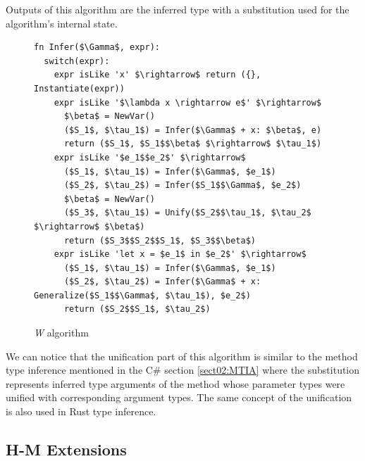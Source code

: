Outputs of this algorithm are the inferred type with a substitution used for the algorithm's internal state. 
\begin{figure}
\begin{lstlisting}[style=myAlgo, mathescape=true]
fn Infer($\Gamma$, expr):
  switch(expr):
    expr isLike 'x' $\rightarrow$ return ({}, Instantiate(expr))
    expr isLike '$\lambda x \rightarrow e$' $\rightarrow$
      $\beta$ = NewVar()
      ($S_1$, $\tau_1$) = Infer($\Gamma$ + x: $\beta$, e)
      return ($S_1$, $S_1$$\beta$ $\rightarrow$ $\tau_1$)
    expr isLike '$e_1$$e_2$' $\rightarrow$
      ($S_1$, $\tau_1$) = Infer($\Gamma$, $e_1$)
      ($S_2$, $\tau_2$) = Infer($S_1$$\Gamma$, $e_2$)
      $\beta$ = NewVar()
      ($S_3$, $\tau_1$) = Unify($S_2$$\tau_1$, $\tau_2$ $\rightarrow$ $\beta$)
      return ($S_3$$S_2$$S_1$, $S_3$$\beta$)
    expr isLike 'let x = $e_1$ in $e_2$' $\rightarrow$
      ($S_1$, $\tau_1$) = Infer($\Gamma$, $e_1$)
      ($S_2$, $\tau_2$) = Infer($\Gamma$ + x: Generalize($S_1$$\Gamma$, $\tau_1$), $e_2$)
      return ($S_2$$S_1$, $\tau_2$)
\end{lstlisting}
\caption{\textit{W} algorithm}
\label{img16:w}
\end{figure}
\par
We can notice that the unification part of this algorithm is similar to the method type inference mentioned in the C\# section \ref{sect02:MTIA} where the substitution represents inferred type arguments of the method whose parameter types were unified with corresponding argument types.
The same concept of the unification is also used in Rust type inference.

\newpage

\subsection{H-M Extensions}

